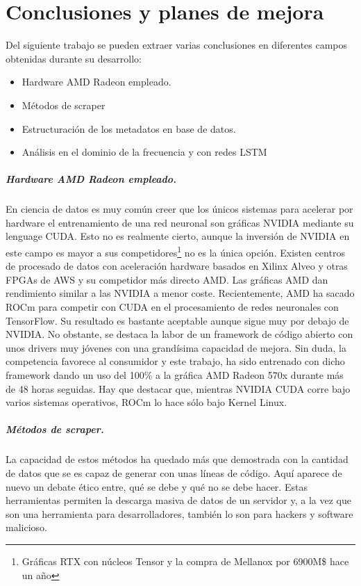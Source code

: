 \chapter{Conclusiones y planes de mejora}\label{cp: conclusions}
Del siguiente trabajo se pueden extraer varias conclusiones en diferentes campos obtenidas durante su desarrollo:
\begin{itemize}
	\item Hardware \gls{AMD} Radeon empleado.
	\item Métodos de \gls{scraper}
	\item Estructuración de los metadatos en base de datos.
	\item Análisis en el dominio de la frecuencia y con redes \gls{LSTM}
\end{itemize}
\paragraph{Hardware \gls{AMD} Radeon empleado.} En ciencia de datos es muy común creer que los únicos sistemas para acelerar por hardware el entrenamiento de una red neuronal son gráficas NVIDIA mediante su lenguage CUDA. Esto no es realmente cierto, aunque la inversión de NVIDIA en este campo es mayor a sus competidores\footnote{Gráficas RTX con núcleos Tensor y la compra de Mellanox por 6900M\$ hace un año} no es la única opción. Existen centros de procesado de datos con aceleración hardware basados en Xilinx Alveo y otras \glspl{FPGA} de \gls{AWS} y su competidor más directo \gls{AMD}. Las gráficas \gls{AMD} dan rendimiento similar a las NVIDIA a menor coste. Recientemente, \gls{AMD} ha sacado \gls{ROCm} para competir con CUDA en el procesamiento de redes neuronales con TensorFlow. Su resultado es bastante aceptable aunque sigue muy por debajo de NVIDIA. No obstante, se destaca la labor de un framework de código abierto con unos drivers muy jóvenes con una grandísima capacidad de mejora. Sin duda, la competencia favorece al consumidor y este trabajo, ha sido entrenado con dicho framework dando un uso del 100\% a la gráfica \gls{AMD} Radeon 570x durante más de 48 horas seguidas. Hay que destacar que, mientras NVIDIA CUDA corre bajo varios sistemas operativos, \gls{ROCm} lo hace sólo bajo Kernel Linux\cite{rocm}.

\paragraph{Métodos de \gls{scraper}.} La capacidad de estos métodos ha quedado más que demostrada con la cantidad de datos que se es capaz de generar con unas líneas de código. Aquí aparece de nuevo un debate ético entre, qué se debe y qué no se debe hacer. Estas herramientas permiten la descarga masiva de datos de un servidor y, a la vez que son una herramienta para desarrolladores, también lo son para hackers y software malicioso.

